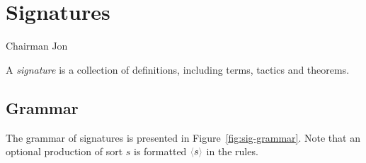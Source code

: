 \chapter{Signatures}

\epigraph{}{\textsf{Chairman Jon}}

A \emph{signature} is a collection of definitions, including terms, tactics and theorems.

\section{Grammar}
\label{sec:sig-grammar}

The grammar of \RedJonPRL{} signatures is presented in
Figure~\ref{fig:sig-grammar}. Note that an optional production of sort $s$ is
formatted $\Optional{s}$ in the rules.

